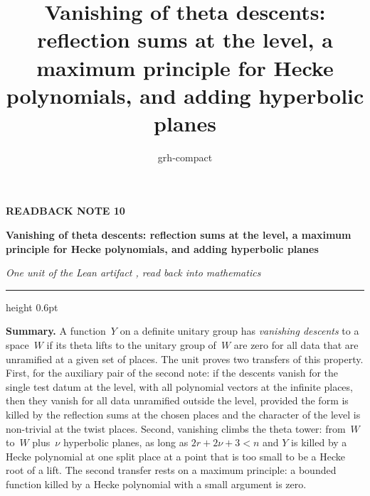 \documentclass[11pt,a4paper]{article}
\title{Vanishing of theta descents: reflection sums at the level, a maximum principle for Hecke polynomials, and adding hyperbolic planes}
\author{grh-compact}
\date{}
\newcommand{\m}[1]{\mbox{$#1$}}        %
\theoremstyle{plainx}
\theoremstyle{uprightx}
\begin{document}
\color{ink}

{\raggedright
{\sffamily\bfseries\fontsize{7.2}{9}\selectfont\color{leancol}READBACK NOTE 10\par}
\vspace{5pt}
{\fontsize{21.5}{25.5}\selectfont\bfseries Vanishing of theta descents: reflection sums at the level, a maximum principle for Hecke polynomials, and adding hyperbolic planes\par}
\vspace{5pt}
{\fontsize{12.4}{16}\selectfont\itshape\color{inksoft} One unit of the Lean artifact \ArtifactName, read back into
mathematics\par}}
\vspace{8pt}
{\color{rulegrey}\hrule height 0.6pt}
\vspace{7pt}
\thispagestyle{empty}

\textbf{Summary.} A function~$Y$ on a definite unitary group has \emph{vanishing descents} to a space~$W$ if
its theta lifts to the unitary group of~$W$ are zero for all data that are unramified at a given set of places.
The unit proves two transfers of this property. First, for the auxiliary pair of the second note: if the
descents vanish for the single test datum at the level, with all polynomial vectors at the infinite places,
then they vanish for all data unramified outside the level, provided the form is killed by the reflection
sums at the chosen places and the character of the level is non-trivial at the twist places. Second, vanishing
climbs the theta tower: from~$W$ to~$W$ plus~$\nu$ hyperbolic planes, as long as \m{2r+2\nu+3<n} and $Y$ is
killed by a Hecke polynomial at one split place at a point that is too small to be a Hecke root of a lift. The
second transfer rests on a maximum principle: a bounded function killed by a Hecke polynomial with a small
argument is zero.
\end{document}

